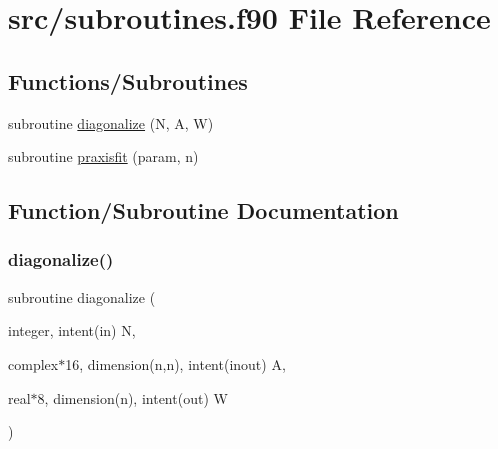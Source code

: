 \hypertarget{subroutines_8f90}{}\section{src/subroutines.f90 File Reference}
\label{subroutines_8f90}
\subsection*{Functions/\+Subroutines}
\begin{DoxyCompactItemize}
\item 
subroutine \hyperlink{subroutines_8f90_a50a3911748dbb5647bf6be5043e905e1}{diagonalize} (N, A, W)
\item 
subroutine \hyperlink{subroutines_8f90_a66d629a9efd7144f6d03009c5cae7c0d}{praxisfit} (param, n)
\end{DoxyCompactItemize}


\subsection{Function/\+Subroutine Documentation}
\mbox{\label{subroutines_8f90_a50a3911748dbb5647bf6be5043e905e1}} 
\subsubsection{\texorpdfstring{diagonalize()}{diagonalize()}}
{\footnotesize\ttfamily subroutine diagonalize (\begin{DoxyParamCaption}\item[{integer, intent(in)}]{N,  }\item[{complex$\ast$16, dimension(n,n), intent(inout)}]{A,  }\item[{real$\ast$8, dimension(n), intent(out)}]{W }\end{DoxyParamCaption})}


